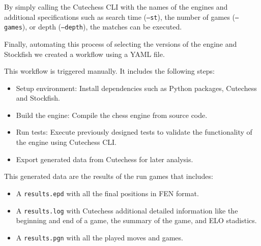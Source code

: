 \noindent By simply calling the Cutechess CLI with the names of the engines and additional specifications such as search time (\texttt{--st}), the number of games (\texttt{--games}), or depth (\texttt{--depth}), the matches can be executed.

\vspace{1em}

\noindent Finally, automating this process of selecting the versions of the engine and Stockfish we created a workflow using a YAML file.

\vspace{1em}

\noindent This workflow is triggered manually. It includes the following steps:

\begin{itemize}
    \item Setup environment: Install dependencies such as Python packages, Cutechess and Stockfish.
    \item Build the engine: Compile the chess engine from source code.
    \item Run tests: Execute previously designed tests to validate the functionality of the engine using Cutechess CLI.
    \item Export generated data from Cutechess for later analysis.
\end{itemize}

This generated data are the results of the run games that includes:

\begin{itemize}
    \item A \texttt{results.epd} with all the final positions in FEN format.
    \item A \texttt{results.log} with Cutechess additional detailed information like the beginning and end of a game, the summary of the game, and ELO stadistics.
    \item A \texttt{results.pgn} with all the played moves and games.
\end{itemize}
